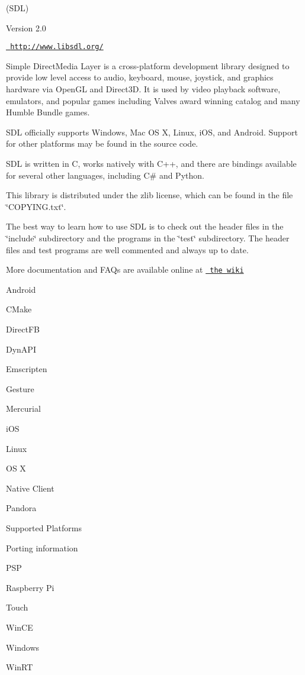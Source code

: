 \begin{DoxyVerb}                              (SDL)

                            Version 2.0
\end{DoxyVerb}


\DoxyHorRuler
 \href{http://www.libsdl.org/}{\texttt{ http\+://www.\+libsdl.\+org/}}

Simple Direct\+Media Layer is a cross-\/platform development library designed to provide low level access to audio, keyboard, mouse, joystick, and graphics hardware via Open\+GL and Direct3D. It is used by video playback software, emulators, and popular games including Valve\textquotesingle{}s award winning catalog and many Humble Bundle games.

S\+DL officially supports Windows, Mac OS X, Linux, i\+OS, and Android. Support for other platforms may be found in the source code.

S\+DL is written in C, works natively with C++, and there are bindings available for several other languages, including C\# and Python.

This library is distributed under the zlib license, which can be found in the file \char`\"{}\+C\+O\+P\+Y\+I\+N\+G.\+txt\char`\"{}.

The best way to learn how to use S\+DL is to check out the header files in the \char`\"{}include\char`\"{} subdirectory and the programs in the \char`\"{}test\char`\"{} subdirectory. The header files and test programs are well commented and always up to date.

More documentation and F\+A\+Qs are available online at \href{http://wiki.libsdl.org/}{\texttt{ the wiki}}


\begin{DoxyItemize}
\item Android
\item C\+Make
\item Direct\+FB
\item Dyn\+A\+PI
\item Emscripten
\item Gesture
\item Mercurial
\item i\+OS
\item Linux
\item OS X
\item Native Client
\item Pandora
\item Supported Platforms
\item Porting information
\item P\+SP
\item Raspberry Pi
\item Touch
\item Win\+CE
\item Windows
\item Win\+RT
\end{DoxyItemize}


